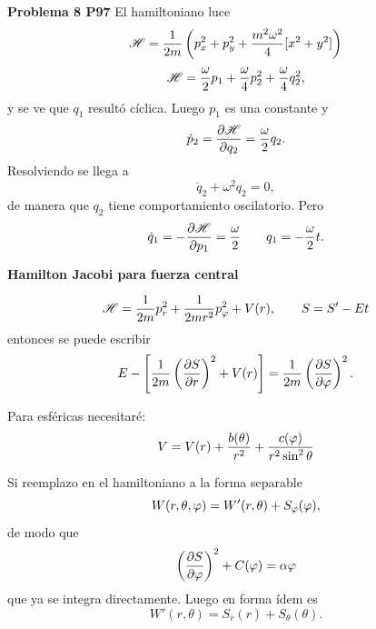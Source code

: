 \documentclass[10pt,oneside]{CBFT_book}
\begin{document}
\begin{ejemplo}{\bf Problema 8 P97}
El hamiltoniano luce
\[
	\mathscr{H} = \frac{1}{2m} \left( p_x^2 + p_y^2 + \frac{m^2\omega^2}{4}[ x^2 + y^2 ] \right)
\]
\[
	\mathscr{H} = \frac{\omega}{2} p_1 + \frac{\omega}{4} p_2^2 + \frac{\omega}{4} q_2^2,
\]
y se ve que $q_1$ resultó cíclica. Luego $p_1$ es una constante y 
\[
	\dot{p}_2 = \frac{\partial^{\hspace{-0.05em}} {\mathscr{H}}}{\partial {q_2}^{\hspace{-0.05em}}} = \frac{\omega}{2} q_2.
\]
Resolviendo se llega a 
\[
	\ddot{q}_2 + \omega^2 q_2 = 0,
\]
de manera que $q_2$ tiene comportamiento oscilatorio. Pero
\[
	\dot{q}_1 = -\frac{\partial^{\hspace{-0.05em}} {\mathscr{H}}}{\partial {p_1}^{\hspace{-0.05em}}} = \frac{\omega}{2} \qquad q_1 = - \frac{\omega}{2} t.
\]
\end{ejemplo}

\begin{ejemplo}{\bf Hamilton Jacobi para fuerza central}

\[
	\mathscr{H} = \frac{1}{2m} p_r^2 + \frac{1}{2mr^2}p_\varphi^2 + V(r), \qquad S = S' - Et
\]
entonces se puede escribir
\[
	E  - \left[ \frac{1}{2m}\left( \frac{\partial^{\hspace{-0.05em}} {S}}{\partial {r}^{\hspace{-0.05em}}} \right)^2 + V(r) \right] = \frac{1}{2m}\left( \frac{\partial^{\hspace{-0.05em}} {S}}{\partial {\varphi}^{\hspace{-0.05em}}} \right)^2.
\]

Para esféricas necesitaré:
\[
	V = V(r) + \frac{b(\theta)}{r^2} + \frac{c(\varphi)}{r^2 \sin^2\theta}
\]

Si reemplazo en el hamiltoniano a la forma separable
\[
	W(r, \theta, \varphi) = W'(r, \theta) + S_\varphi(\varphi),
\]
de modo que 
\[
	\left( \frac{\partial^{\hspace{-0.05em}} {S}}{\partial {\varphi}^{\hspace{-0.05em}}} \right)^2 + C(\varphi) = \alpha \varphi
\]
que ya se integra directamente. Luego en forma ídem es
\[
	W'(r, \theta) = S_r( r ) + S_\theta(\theta).
\]
\end{ejemplo}
\end{document}
